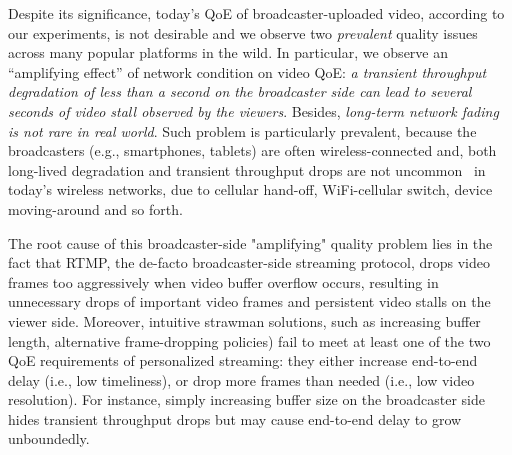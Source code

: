 %
%

Despite its significance, today's QoE of broadcaster-uploaded video,
according to our experiments, is not desirable and we observe two {\em prevalent}
quality issues across many popular platforms in the wild.
In particular, we observe an ``amplifying effect'' of network
condition on video QoE: {\em a transient throughput  degradation
of less than a second on the broadcaster side can lead to
several seconds of video stall observed by the viewers}. Besides, {\em long-term network fading is not rare in real world}.
Such problem is particularly prevalent, because the broadcasters
(e.g., smartphones, tablets) are often wireless-connected and, both
long-lived degradation and transient throughput drops are not
uncommon~\cite{some paper to show this}  in today's wireless networks,
due to cellular hand-off, WiFi-cellular
switch, device moving-around and so forth.


The root cause of this broadcaster-side "amplifying" quality problem
lies in the fact that RTMP, the de-facto broadcaster-side streaming protocol,
drops video frames too aggressively when video buffer overflow
occurs, resulting in unnecessary drops of important video frames and
persistent video stalls on the viewer side.
Moreover, intuitive strawman solutions, such as increasing
buffer length, alternative frame-dropping policies) fail to meet at least one
of the two QoE requirements of personalized streaming:
they either increase end-to-end delay (i.e., low timeliness), or drop more
frames than needed (i.e., low video resolution).
For instance, simply increasing buffer size on the broadcaster
side hides transient throughput drops but may cause end-to-end
delay to grow unboundedly.

